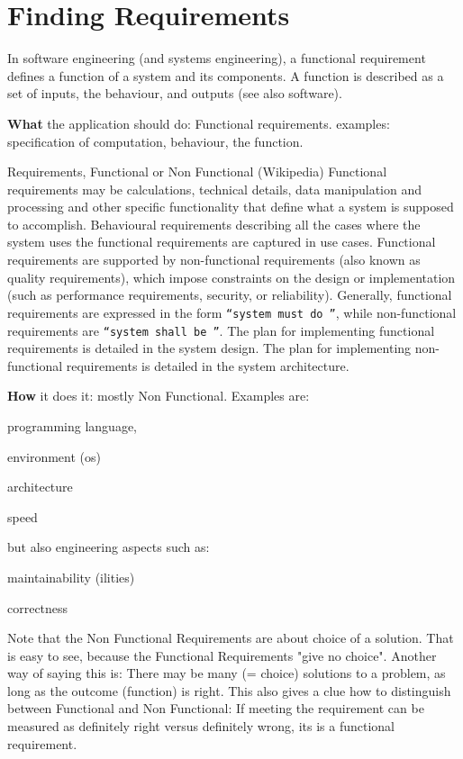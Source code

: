 \documentclass[\docroot/main]{subfiles}
\begin{document}
\chapter{Finding Requirements}
In software engineering (and systems engineering), a functional
requirement defines a function of a system and its components. A
function is described as a set of inputs, the behaviour, and outputs
(see also software).

\textbf{What} the application should do: Functional requirements.
examples: specification of computation, behaviour, the function.

\begin{textbox}{Requirements, Functional or Non Functional (Wikipedia)}
  Functional requirements may be calculations, technical details, data
  manipulation and processing and other specific functionality that
  define what a system is supposed to accomplish. Behavioural
  requirements describing all the cases where the system uses the
  functional requirements are captured in use cases. Functional
  requirements are supported by non-functional requirements (also known
  as quality requirements), which impose constraints on the design or
  implementation (such as performance requirements, security, or
  reliability). Generally, functional requirements are expressed in the
  form \texttt{``system must do ''}, while non-functional
  requirements are \texttt{``system shall be ''}. The plan for
  implementing functional requirements is detailed in the system
  design. The plan for implementing non-functional requirements is
  detailed in the system architecture.
\end{textbox}

\textbf{How} it does it: mostly Non Functional.
Examples are:
\begin{multicols}{2}
\begin{itemize*}
\item programming language,
\item environment (os)
\item architecture
\item speed
\end{itemize*}
\vfill\columnbreak
but also engineering aspects such as:
\begin{itemize*}
  \item maintainability  (ilities)
  \item correctness
\end{itemize*}\vfill
\end{multicols}
Note that the Non Functional Requirements  are about choice of a
solution. That is easy to see, because the Functional Requirements
"give no choice". Another way of saying this is: There may be many (= choice)
solutions to a problem, as long as the outcome (function) is right.
This also gives a clue how to distinguish between Functional and Non
Functional: If meeting the requirement can be measured as  definitely right
versus definitely wrong, its is a functional requirement.
\end{document}
